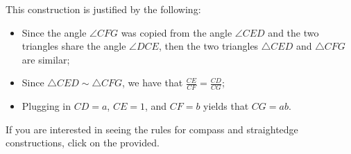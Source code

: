 \documentclass[12pt]{article}
\begin{document}
This construction is justified by the following:

\begin{itemize}
\item Since the angle $\angle CFG$ was copied from the angle $\angle CED$ and the two triangles share the angle $\angle DCE$, then the two triangles $\triangle CED$ and $\triangle CFG$ are similar;
\item Since $\triangle CED \sim \triangle CFG$, we have that $\displaystyle \frac{CE}{CF}=\frac{CD}{CG}$;
\item Plugging in $CD=a$, $CE=1$, and $CF=b$ yields that $CG=ab$.
\end{itemize}

If you are interested in seeing the rules for compass and straightedge constructions, click on the  provided.
\end{document}
